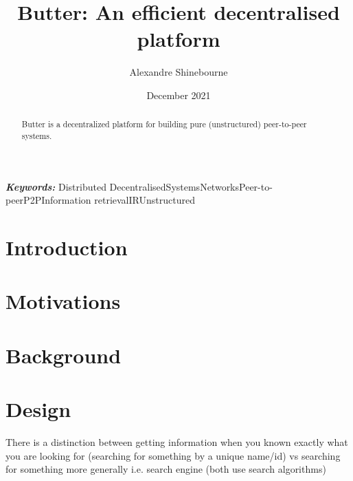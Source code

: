 \documentclass[a4paper]{article}
\title{Butter: An efficient decentralised platform}
\author{Alexandre Shinebourne}
\date{December 2021}
\providecommand{\keywords}[1]
{
    \small
    \textbf{\textit{Keywords: }} #1
}
\begin{document}
    \maketitle

    \begin{abstract}
        Butter is a decentralized platform for building pure (unstructured) peer-to-peer systems.
    \end{abstract}

    \keywords{Distributed}{Decentralised}{Systems}{Networks}{Peer-to-peer}{P2P}{Information retrieval}{IR}{Unstructured}

    \tableofcontents



    \section{Introduction}
    \section{Motivations}
    \section{Background}
    \section{Design}
    There is a distinction between getting information when you known exactly what you are looking for (searching for something by a unique name/id) vs searching for something more generally i.e. search engine (both use search algorithms)
\end{document}
